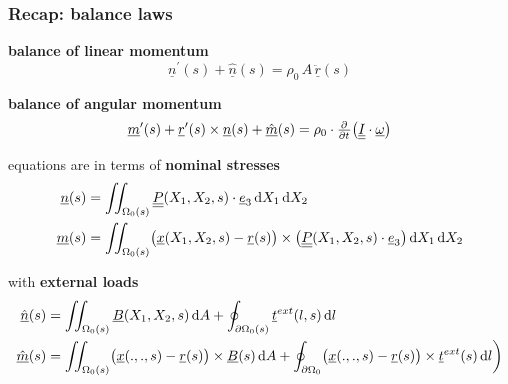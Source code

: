 \begin{frame}
  \frametitle{Recap: balance laws}

  \textbf{balance of linear momentum}
  \begin{displaymath}
    \underline{n}^{\prime}(s) + \underline{\hat{n}}(s) =
    \rho_0 \, A \, \underline{\ddot{r}}(s)
  \end{displaymath}
  
  \vspace{0.5em}
  \textbf{balance of angular momentum}
  \begin{displaymath}
    \underline{m}^{\prime}(s) + \underline{r}^{\prime}(s) \times \underline{n}(s) + \underline{\hat{m}}(s) =
    \rho_0 \cdot
    \pd{}{t} \bigl( \doubleunderline{I} \cdot \underline{\omega} \bigr)
  \end{displaymath}
  
  \vspace{0.5em}
  equations are in terms of \textbf{nominal stresses} %
  \begin{displaymath}
    \begin{alignedat}{1}
      \underline{n}(s) &= \iint_{\Omega_0(s)} \doubleunderline{P}(X_1, X_2, s) \cdot \underline{e}_3 \dif X_1 \dif X_2 \\
      \underline{m}(s) &= \iint_{\Omega_0(s)} \bigl( \underline{x}(X_1,X_2,s) - \underline{r}(s) \bigr) \times \bigl( \doubleunderline{P}(X_1,X_2,s) \cdot \underline{e}_3 \bigr) \dif X_1 \dif X_2 %
    \end{alignedat}
  \end{displaymath}
  
  \vspace{0.5em}
  with \textbf{external loads}
  \begin{displaymath}
    \begin{alignedat}{1}
      \underline{\hat{n}}(s) &= \iint_{\Omega_{0}(s)} \underline{B}(X_1,X_2,s) \dif A + \oint_{\partial \Omega_{0}(s)} \underline{t}^{ext}(l,s) \dif l \\
      \underline{\hat{m}}(s) &= \iint_{\Omega_{0}(s)} \bigl( \underline{x}(.,.,s) - \underline{r}(s) \bigr) \times \underline{B}(s) \dif A + \oint_{\partial \Omega_0} \bigl( \underline{x}(.,.,s) - \underline{r}(s) \bigr) \times \underline{t}^{ext}(s) \dif l \biggr)
    \end{alignedat}
  \end{displaymath}
  
\end{frame}

